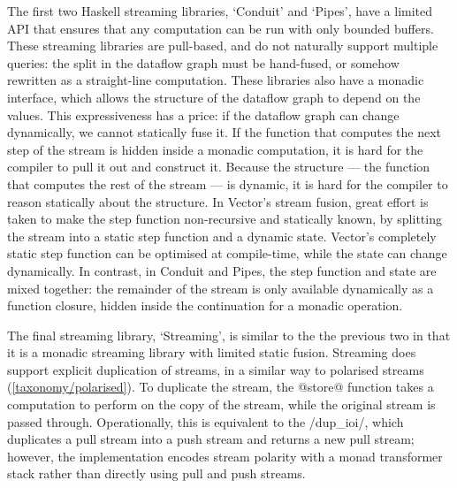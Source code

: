 The first two Haskell streaming libraries, `Conduit' and `Pipes', have a limited API that ensures that any computation can be run with only bounded buffers.
These streaming libraries are pull-based, and do not naturally support multiple queries: the split in the dataflow graph must be hand-fused, or somehow rewritten as a straight-line computation.
These libraries also have a monadic interface, which allows the structure of the dataflow graph to depend on the values. This expressiveness has a price: if the dataflow graph can change dynamically, we cannot statically fuse it.
If the function that computes the next step of the stream is hidden inside a monadic computation, it is hard for the compiler to pull it out and construct it.
Because the structure --- the function that computes the rest of the stream --- is dynamic, it is hard for the compiler to reason statically about the structure.
In Vector's stream fusion, great effort is taken to make the step function non-recursive and statically known, by splitting the stream into a static step function and a dynamic state.
Vector's completely static step function can be optimised at compile-time, while the state can change dynamically.
In contrast, in Conduit and Pipes, the step function and state are mixed together: the remainder of the stream is only available dynamically as a function closure, hidden inside the continuation for a monadic operation.

The final streaming library, `Streaming', is similar to the the previous two in that it is a monadic streaming library with limited static fusion.
Streaming does support explicit duplication of streams, in a similar way to polarised streams (\cref{taxonomy/polarised}).
To duplicate the stream, the @store@ function takes a computation to perform on the copy of the stream, while the original stream is passed through.
Operationally, this is equivalent to the \Hs/dup_ioi/, which duplicates a pull stream into a push stream and returns a new pull stream; however, the implementation encodes stream polarity with a monad transformer stack rather than directly using pull and push streams.



